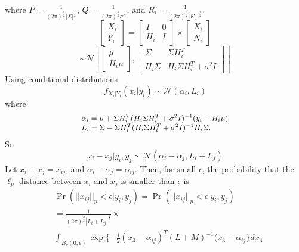 \documentclass{article}
\begin{document}
where $P=\frac{1}{({2\pi})^{\frac{d}{2}}{|\Sigma|}^{\frac{1}{2}}}$, $Q=\frac{1}{({2\pi})^{\frac{d}{2}}\sigma^n}$, and $R_i=\frac{1}{({2\pi})^{\frac{d}{2}} {|K_1|}^{\frac{1}{2}}}$.
\begin{equation}
 \left[\begin{array}{c} X_i \\ Y_i \end{array}\right] = 
\begin{bmatrix} I & 0 \\ H_i & I \end{bmatrix} \times \left[ \begin{array}{c} X_i \\ N_i \end{array} \right]      
\end{equation}
\begin{equation}
 \sim \mathcal{N} \left[\begin{bmatrix} \mu \\ H_i \mu \end{bmatrix}, \begin{bmatrix} \Sigma & \Sigma H_i^T \\ H_i \Sigma & H_i \Sigma H_i^T + \sigma^2 I \end{bmatrix} \right]
\end{equation}
\noindent
Using conditional distributions
 \begin{equation}
  f_{X_i|Y_i}(x_i|y_i) \sim \mathcal{N}(\alpha_i, L_i)
 \end{equation}
where 
\begin{equation}
\small{
\begin{array}{l}\alpha_i = \mu + \Sigma H_i^T (H_i \Sigma H_i^T + \sigma^2 I)^{-1} (y_i - H_i \mu) \\ L_i = \Sigma - \Sigma H_i^T (H_i \Sigma H_i^T + \sigma^2 I)^{-1} H_i \Sigma .
       \end{array}}  
\end{equation}
So
\begin{equation}
x_i - x_j|y_i, y_j \sim \mathcal{N}(\alpha_i-\alpha_j, L_i+L_j)
\end{equation}
Let $x_i - x_j = x_{ij}$, and $\alpha_i -\alpha_j=\alpha_{ij}$. Then, for small $\epsilon$, the probability that the $\ell_p$ distance between $x_i$ and $x_j$ is smaller than $\epsilon$ is
\begin{align}
&\Pr(||x_{ij}||_{p} < \epsilon|y_i,y_j)   \nonumber
										 =	 \Pr(||x_{ij}||_{p} < \epsilon|y_i,y_j)\\ \nonumber
										&=   \frac{1}{(2 \pi)^{\frac{d}{2}} |L_{i}+L_{j}|^ \frac{1}{2}} \times \\ 
										& \int_{B_p(0,\epsilon) }^{}\exp \{ -\frac{1}{2}(x_3 - \alpha_{ij})^T(L+M)^{-1}(x_3 - \alpha_{ij}\}dx_3 
\end{align}
\end{document}
